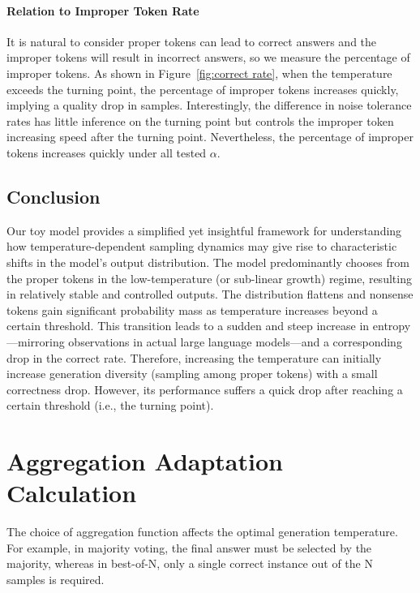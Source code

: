 \paragraph{Relation to Improper Token Rate} It is natural to consider proper tokens can lead to correct answers and the improper tokens will result in incorrect answers, so we measure the percentage of improper tokens. As shown in Figure~\ref{fig:correct rate}, when the temperature exceeds the turning point, the percentage of improper tokens increases quickly, implying a quality drop in samples. Interestingly, the difference in noise tolerance rates has little inference on the turning point but controls the improper token increasing speed after the turning point. Nevertheless, the percentage of improper tokens increases quickly under all tested $\alpha$.

\subsection{Conclusion}
Our toy model provides a simplified yet insightful framework for understanding how temperature-dependent sampling dynamics may give rise to characteristic shifts in the model’s output distribution. The model predominantly chooses from the proper tokens in the low-temperature (or sub-linear growth) regime, resulting in relatively stable and controlled outputs. The distribution flattens and nonsense tokens gain significant probability mass as temperature increases beyond a certain threshold. This transition leads to a sudden and steep increase in entropy—mirroring observations in actual large language models—and a corresponding drop in the correct rate. Therefore, increasing the temperature can initially increase generation diversity (sampling among proper tokens) with a small correctness drop. However, its performance suffers a quick drop after reaching a certain threshold (i.e., the turning point).

\section{Aggregation Adaptation Calculation}
\label{app: bias}
The choice of aggregation function affects the optimal generation temperature. For example, in majority voting, the final answer must be selected by the majority, whereas in best-of-N, only a single correct instance out of the N samples is required.

